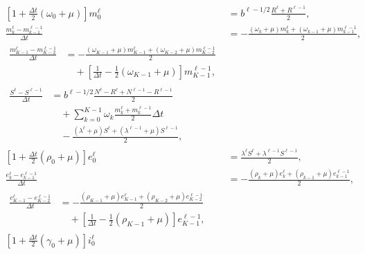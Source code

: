 \documentclass{jpmarticle}
\let\subequationsorig\subequations%
\let\endsubequationsorig\endsubequations%
\renewenvironment{subequations}{
  \subequationsorig
  \renewcommand{\theequation}{\theparentequation.\arabic{equation}}
}{
  \endsubequationsorig
}
\begin{document}
\begin{subequations}
  \label{numerics_time_since_entry_structured}
  \begin{align}
    \left[1 + \frac{\Delta t}{2} (\omega_0 + \mu)\right] m_0^{\ell}
    &= b^{\ell - 1 / 2} \frac{R^{\ell} + R^{\ell - 1}}{2},
    \\
    \frac{m_k^{\ell} - m_{k - 1}^{\ell - 1}}{\Delta t} &=
    - \frac{(\omega_k + \mu) m_k^{\ell}
      + (\omega_{k - 1} + \mu) m_{k - 1}^{\ell - 1}}{2},
    \\
    \begin{split}
      \frac{m_{K - 1}^{\ell} - m_{K - 2}^{\ell - 1}}{\Delta t} &=
      - \frac{(\omega_{K - 1} + \mu) m_{K - 1}^{\ell}
        + (\omega_{K - 2} + \mu) m_{K - 2}^{\ell - 1}}{2}
      \\ & \quad {}
      + \left[
        \frac{1}{\Delta t} - \frac{1}{2} (\omega_{K - 1} + \mu)
      \right] m_{K - 1}^{\ell - 1},
    \end{split}
    \\
    \begin{split}
      \frac{S^{\ell} - S^{\ell - 1}}{\Delta t} &=
      b^{\ell - 1 / 2}
      \frac{N^{\ell} - R^{\ell} + N^{\ell - 1} - R^{\ell - 1}}{2}
      \\ & \quad {}
      + \sum_{k = 0}^{K - 1} \omega_k
      \frac{m_k^{\ell} + m_k^{\ell - 1}}{2}
      \Delta t
      \\ & \quad {}
      - \frac{(\lambda^{\ell} + \mu) S^{\ell}
        + (\lambda^{\ell - 1} + \mu) S^{\ell - 1}}{2},
    \end{split}
    \\
    \left[1 + \frac{\Delta t}{2} (\rho_0 + \mu)\right] e_0^{\ell}
    &= \frac{\lambda^{\ell} S^{\ell} + \lambda^{\ell - 1} S^{\ell - 1}}{2},
    \\
    \frac{e_k^{\ell} - e_{k - 1}^{\ell - 1}}{\Delta t} &=
    - \frac{(\rho_k + \mu) e_k^{\ell}
      + (\rho_{k - 1} + \mu) e_{k - 1}^{\ell - 1}}{2},
    \\
    \begin{split}
      \frac{e_{K - 1}^{\ell} - e_{K - 2}^{\ell - 1}}{\Delta t} &=
      - \frac{(\rho_{K - 1} + \mu) e_{K - 1}^{\ell}
        + (\rho_{K - 2} + \mu) e_{K - 2}^{\ell - 1}}{2}
      \\ & \quad {}
      + \left[
        \frac{1}{\Delta t} - \frac{1}{2} (\rho_{K - 1} + \mu)
      \right] e_{K - 1}^{\ell - 1},
    \end{split}
    \\
    \left[1 + \frac{\Delta t}{2} (\gamma_0 + \mu)\right] i_0^{\ell}

\end{align}
\end{subequations}
\end{document}
